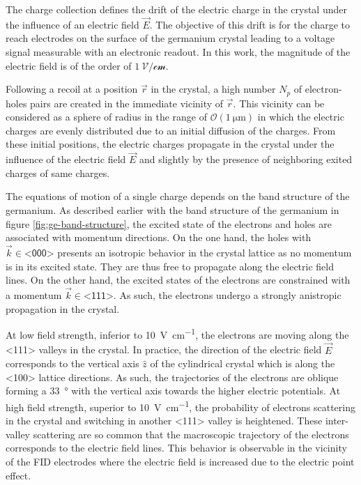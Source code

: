 The charge collection defines the drift of the electric charge in the crystal under the influence of an electric field $\vec{E}$. The objective of this drift is for the charge to reach electrodes on the surface of the germanium crystal leading to a voltage signal measurable with an electronic readout. In this work, the magnitude of the electric field is of the order of $\mathcal{\SI{1}{\volt\per\cm}}$. 

Following a recoil at a position $\vec{r}$ in the crystal, a high number $N_p$ of electron-holes pairs are created in the immediate vicinity of $\vec{r}$. This vicinity can be considered as a sphere of radius in the range of $\mathcal{O}(\SI{1}{\micro\m})$ in which the electric charges are evenly distributed due to an initial diffusion of the charges. From these initial positions, the electric charges propagate in the crystal under the influence of the electric field $\vec{E}$ and slightly by the presence of neighboring exited charges of same charges. 

The equations of motion of a single charge depends on the band structure of the germanium. As described earlier with the band structure of the germanium in figure \ref{fig:ge-band-structure}, the excited state of the electrons and holes are associated with momentum directions. On the one hand, the holes with $\vec{k} \in \textsf{<000>}$ presents an isotropic behavior in the crystal lattice as no momentum is in its excited state. They are thus free to propagate along the electric field lines. On the other hand, the excited states of the electrons are constrained with a momentum $\vec{k} \in \textsf{<111>}$. As such, the electrons undergo a strongly anistropic propagation in the crystal.

At low field strength, inferior to \SI{10}{\volt\per\cm}, the electrons are moving along the <111> valleys in the crystal. In practice, the direction of the electric field $\vec{E}$ corresponds to the vertical axis $\hat{z}$ of the cylindrical crystal which is along the <100> lattice directions. As such, the trajectories of the electrons are oblique forming a \SI{33}{\degree} with the vertical axis towards the higher electric potentials.
At high field strength, superior to \SI{10}{\volt\per\cm}, the probability of electrons scattering in the crystal and switching in another <111> valley is heightened. These inter-valley scattering are so common that the macroscopic trajectory of the electrons corresponds to the electric field lines. This behavior is observable in the vicinity of the FID electrodes where the electric field is increased due to the electric point effect.


